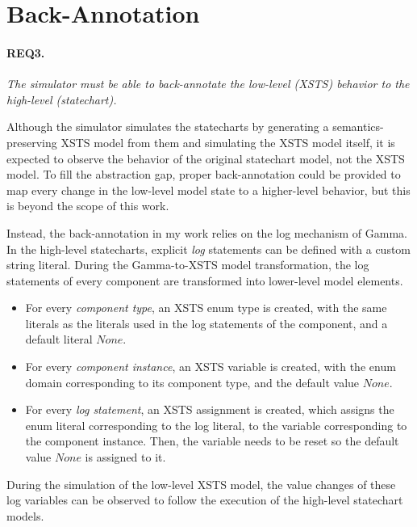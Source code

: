 \section{Back-Annotation}\label{sec:req-backannotate}

\paragraph{REQ3.} \textit{The simulator must be able to back-annotate the low-level (XSTS) behavior to the high-level (statechart).}

Although the simulator simulates the statecharts by generating a semantics-preserving XSTS model from them and simulating the XSTS model itself, it is expected to observe the behavior of the original statechart model, not the XSTS model. To fill the abstraction gap, proper back-annotation could be provided to map every change in the low-level model state to a higher-level behavior, but this is beyond the scope of this work.

Instead, the back-annotation in my work relies on the log mechanism of Gamma. In the high-level statecharts, explicit \textit{log} statements can be defined with a custom string literal. During the Gamma-to-XSTS model transformation, the log statements of every component are transformed into lower-level model elements.

\begin{itemize}
    \item For every \textit{component type}, an XSTS enum type is created, with the same literals as the literals used in the log statements of the component, and a default literal $\mathit{None}$.
    \item For every \textit{component instance}, an XSTS variable is created, with the enum domain corresponding to its component type, and the default value $\mathit{None}$.
    \item For every \textit{log statement}, an XSTS assignment is created, which assigns the enum literal corresponding to the log literal, to the variable corresponding to the component instance. Then, the variable needs to be reset so the default value $\mathit{None}$ is assigned to it.
\end{itemize}

During the simulation of the low-level XSTS model, the value changes of these log variables can be observed to follow the execution of the high-level statechart models.

